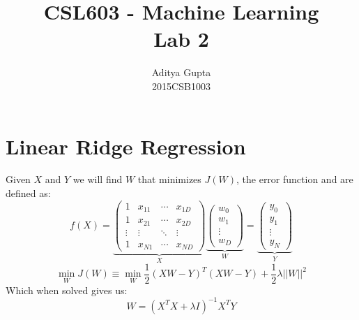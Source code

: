 \documentclass{article}
\title{CSL603 - Machine Learning\\Lab 2}
\author{Aditya Gupta\\2015CSB1003}
\begin{document}
\maketitle
\section{Linear Ridge Regression}
Given $X$ and $Y$ we will find $W$ that minimizes $J(W)$, the error function and are defined as:
$$f(X)=
\underbrace{
\begin{pmatrix}
1&x_{11}&\cdots&x_{1D}\\
1&x_{21}&\cdots&x_{2D}\\
\vdots&\vdots&\ddots&\vdots\\
1&x_{N1}&\cdots&x_{ND}
\end{pmatrix}}_{X}
\underbrace{
\begin{pmatrix}
w_0\\w_1\\\vdots\\w_D
\end{pmatrix}}_{W}
=
\underbrace{
\begin{pmatrix}
y_0\\y_1\\\vdots\\y_N
\end{pmatrix}}_{Y}$$
$$
\min_W J(W)\equiv\min_W\frac12(XW-Y)^T(XW-Y)+\frac12\lambda||W||^2
$$
Which when solved gives us:
$$W=(X^TX+\lambda I)^{-1}X^TY$$
\end{document}
